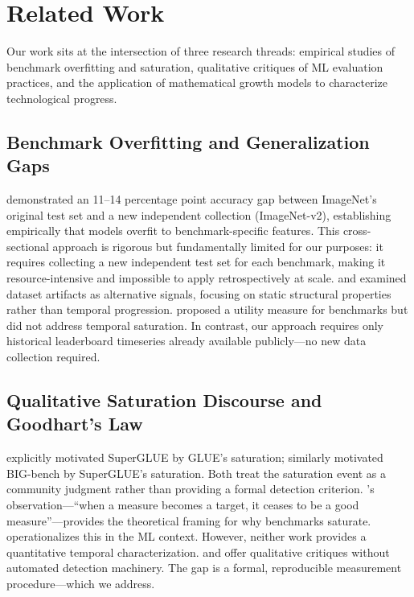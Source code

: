 \section{Related Work}

Our work sits at the intersection of three research threads: empirical studies of benchmark overfitting and saturation, qualitative critiques of ML evaluation practices, and the application of mathematical growth models to characterize technological progress.

\subsection{Benchmark Overfitting and Generalization Gaps}

\citet{recht2019imagenet} demonstrated an 11--14 percentage point accuracy gap between ImageNet's original test set and a new independent collection (ImageNet-v2), establishing empirically that models overfit to benchmark-specific features.
This cross-sectional approach is rigorous but fundamentally limited for our purposes: it requires collecting a new independent test set for each benchmark, making it resource-intensive and impossible to apply retrospectively at scale.
\citet{engstrom2020identifying} and \citet{gururangan2018annotation} examined dataset artifacts as alternative signals, focusing on static structural properties rather than temporal progression.
\citet{ethayarajh2020utility} proposed a utility measure for benchmarks but did not address temporal saturation.
In contrast, our approach requires only historical leaderboard timeseries already available publicly---no new data collection required.

\subsection{Qualitative Saturation Discourse and Goodhart's Law}

\citet{wang2019superglue} explicitly motivated SuperGLUE by GLUE's saturation; \citet{srivastava2022bigbench} similarly motivated BIG-bench by SuperGLUE's saturation.
Both treat the saturation event as a community judgment rather than providing a formal detection criterion.
\citet{goodhart1975problems}'s observation---``when a measure becomes a target, it ceases to be a good measure''---provides the theoretical framing for why benchmarks saturate.
\citet{manheim2019categorizing} operationalizes this in the ML context.
However, neither work provides a quantitative temporal characterization.
\citet{bender2021stochastic} and \citet{kapoor2023leakage} offer qualitative critiques without automated detection machinery.
The gap is a formal, reproducible measurement procedure---which we address.

